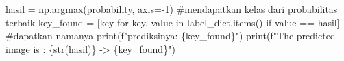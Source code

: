 \documentclass[
  letterpaper,
  DIV=11,
  numbers=noendperiod]{scrreprt}
\newenvironment{Shaded}{\begin{snugshade}}{\end{snugshade}}
\newcommand{\BuiltInTok}[1]{\textcolor[rgb]{0.00,0.23,0.31}{#1}}
\newcommand{\CommentTok}[1]{\textcolor[rgb]{0.37,0.37,0.37}{#1}}
\newcommand{\ControlFlowTok}[1]{\textcolor[rgb]{0.00,0.23,0.31}{#1}}
\newcommand{\DecValTok}[1]{\textcolor[rgb]{0.68,0.00,0.00}{#1}}
\newcommand{\KeywordTok}[1]{\textcolor[rgb]{0.00,0.23,0.31}{#1}}
\newcommand{\NormalTok}[1]{\textcolor[rgb]{0.00,0.23,0.31}{#1}}
\newcommand{\OperatorTok}[1]{\textcolor[rgb]{0.37,0.37,0.37}{#1}}
\newcommand{\SpecialCharTok}[1]{\textcolor[rgb]{0.37,0.37,0.37}{#1}}
\newcommand{\SpecialStringTok}[1]{\textcolor[rgb]{0.13,0.47,0.30}{#1}}
\begin{document}
\begin{Shaded}
\begin{Highlighting}[]
    
\NormalTok{hasil }\OperatorTok{=}\NormalTok{ np.argmax(probability, axis}\OperatorTok{={-}}\DecValTok{1}\NormalTok{) }\CommentTok{\#mendapatkan kelas dari probabilitas terbaik}
\NormalTok{key\_found }\OperatorTok{=}\NormalTok{ [key }\ControlFlowTok{for}\NormalTok{ key, value }\KeywordTok{in}\NormalTok{ label\_dict.items() }\ControlFlowTok{if}\NormalTok{ value }\OperatorTok{==}\NormalTok{ hasil] }\CommentTok{\#dapatkan namanya}
\BuiltInTok{print}\NormalTok{(}\SpecialStringTok{f"prediksinya: }\SpecialCharTok{\{}\NormalTok{key\_found}\SpecialCharTok{\}}\SpecialStringTok{"}\NormalTok{)}
\BuiltInTok{print}\NormalTok{(}\SpecialStringTok{f"The predicted image is : }\SpecialCharTok{\{}\BuiltInTok{str}\NormalTok{(hasil)}\SpecialCharTok{\}}\SpecialStringTok{ {-}\textgreater{} }\SpecialCharTok{\{}\NormalTok{key\_found}\SpecialCharTok{\}}\SpecialStringTok{"}\NormalTok{)}
\end{Highlighting}
\end{Shaded}
\end{document}
